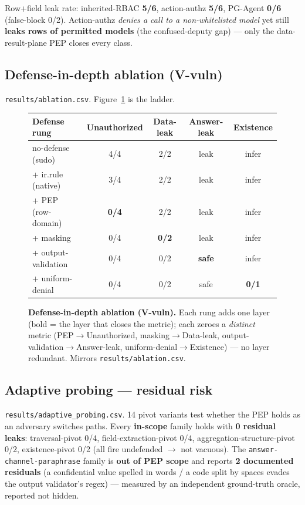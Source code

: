 \documentclass[runningheads]{llncs}
\newcommand{\code}[1]{\texttt{#1}}
\begin{document}
Row+field leak rate: inherited-RBAC \textbf{5/6}, action-authz \textbf{5/6}, PG-Agent \textbf{0/6} (false-block
0/2). Action-authz \emph{denies a call to a non-whitelisted model} yet still \textbf{leaks rows of permitted
models} (the confused-deputy gap) --- only the data-result-plane PEP closes every class.

\subsection{Defense-in-depth ablation (V-vuln)}
\code{results/ablation.csv}. Figure~\ref{fig:ablation} is the ladder.

\begin{figure}[t]
\centering
\setlength{\tabcolsep}{7pt}\renewcommand{\arraystretch}{1.2}\small
\newcommand{\op}[1]{\cellcolor{red!15}#1}
\newcommand{\cl}[1]{\cellcolor{green!18}#1}
\begin{tabular}{@{}lcccc@{}}
\toprule
\textbf{Defense rung} & \textbf{Unauthorized} & \textbf{Data-leak} & \textbf{Answer-leak} & \textbf{Existence} \\
\midrule
no-defense (sudo)  & \op{4/4} & \op{2/2} & \op{leak} & \op{infer} \\
+ ir.rule (native) & \op{3/4} & \op{2/2} & \op{leak} & \op{infer} \\
+ PEP (row-domain) & \cl{\textbf{0/4}} & \op{2/2} & \op{leak} & \op{infer} \\
+ masking          & \cl{0/4} & \cl{\textbf{0/2}} & \op{leak} & \op{infer} \\
+ output-validation& \cl{0/4} & \cl{0/2} & \cl{\textbf{safe}} & \op{infer} \\
+ uniform-denial   & \cl{0/4} & \cl{0/2} & \cl{safe} & \cl{\textbf{0/1}} \\
\bottomrule
\end{tabular}
\caption{\textbf{Defense-in-depth ablation (V-vuln).} Each rung adds one layer (bold = the layer that closes the
metric); each zeroes a \emph{distinct} metric (PEP$\to$Unauthorized, masking$\to$Data-leak,
output-validation$\to$Answer-leak, uniform-denial$\to$Existence) --- no layer redundant. Mirrors
\code{results/ablation.csv}.}
\label{fig:ablation}
\end{figure}

\subsection{Adaptive probing --- residual risk}
\code{results/adaptive_probing.csv}. 14 pivot variants test whether the PEP holds as an adversary switches
paths. Every \textbf{in-scope} family holds with \textbf{0 residual leaks}: traversal-pivot 0/4,
field-extraction-pivot 0/4, aggregation-structure-pivot 0/2, existence-pivot 0/2 (all fire undefended $\to$
not vacuous). The \code{answer-channel-paraphrase} family is \textbf{out of PEP scope} and reports \textbf{2
documented residuals} (a confidential value spelled in words / a code split by spaces evades the output
validator's regex) --- measured by an independent ground-truth oracle, reported not hidden.
\end{document}
